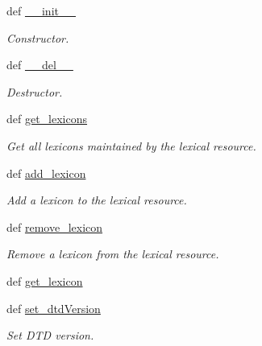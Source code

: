 \begin{DoxyCompactItemize}
\item 
def \hyperlink{classlmf_1_1src_1_1core_1_1lexical__resource_1_1_lexical_resource_a8f7f77cfb5a432a9968844c33e6123a2}{\+\_\+\+\_\+init\+\_\+\+\_\+}
\begin{DoxyCompactList}\small\item\em Constructor. \end{DoxyCompactList}\item 
def \hyperlink{classlmf_1_1src_1_1core_1_1lexical__resource_1_1_lexical_resource_ae39531404208c5fdb20f431d7949568f}{\+\_\+\+\_\+del\+\_\+\+\_\+}
\begin{DoxyCompactList}\small\item\em Destructor. \end{DoxyCompactList}\item 
def \hyperlink{classlmf_1_1src_1_1core_1_1lexical__resource_1_1_lexical_resource_a6294a827ab54971b60c5843cb69d379c}{get\+\_\+lexicons}
\begin{DoxyCompactList}\small\item\em Get all lexicons maintained by the lexical resource. \end{DoxyCompactList}\item 
def \hyperlink{classlmf_1_1src_1_1core_1_1lexical__resource_1_1_lexical_resource_a64ea1ed8f75c1aee5a2ff07786d81851}{add\+\_\+lexicon}
\begin{DoxyCompactList}\small\item\em Add a lexicon to the lexical resource. \end{DoxyCompactList}\item 
def \hyperlink{classlmf_1_1src_1_1core_1_1lexical__resource_1_1_lexical_resource_a7b823f2fc2470472980e061420799c3f}{remove\+\_\+lexicon}
\begin{DoxyCompactList}\small\item\em Remove a lexicon from the lexical resource. \end{DoxyCompactList}\item 
def \hyperlink{classlmf_1_1src_1_1core_1_1lexical__resource_1_1_lexical_resource_a83880e971a7137cd9b0599bd056702a1}{get\+\_\+lexicon}
\item 
def \hyperlink{classlmf_1_1src_1_1core_1_1lexical__resource_1_1_lexical_resource_ab7c55ab127f99a66f00864635fb4e946}{set\+\_\+dtd\+Version}
\begin{DoxyCompactList}\small\item\em Set D\+T\+D version. \end{DoxyCompactList}\item 

\end{DoxyCompactItemize}

